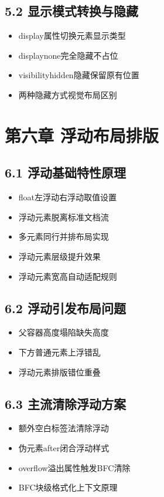 \subsection{5.2 显示模式转换与隐藏}
\begin{itemize}[leftmargin=*]
\item display属性切换元素显示类型
\item display\:none完全隐藏不占位
\item visibility\:hidden隐藏保留原有位置
\item 两种隐藏方式视觉布局区别
\end{itemize}

\section{第六章 浮动布局排版}
\subsection{6.1 浮动基础特性原理}
\begin{itemize}[leftmargin=*]
\item float左浮动右浮动取值设置
\item 浮动元素脱离标准文档流
\item 多元素同行并排布局实现
\item 浮动元素层级提升效果
\item 浮动元素宽高自动适配规则
\end{itemize}

\subsection{6.2 浮动引发布局问题}
\begin{itemize}[leftmargin=*]
\item 父容器高度塌陷缺失高度
\item 下方普通元素上浮错乱
\item 浮动元素排版错位重叠
\end{itemize}

\subsection{6.3 主流清除浮动方案}
\begin{itemize}[leftmargin=*]
\item 额外空白标签法清除浮动
\item 伪元素\:after闭合浮动样式
\item overflow溢出属性触发BFC清除
\item BFC块级格式化上下文原理
\end{itemize}


